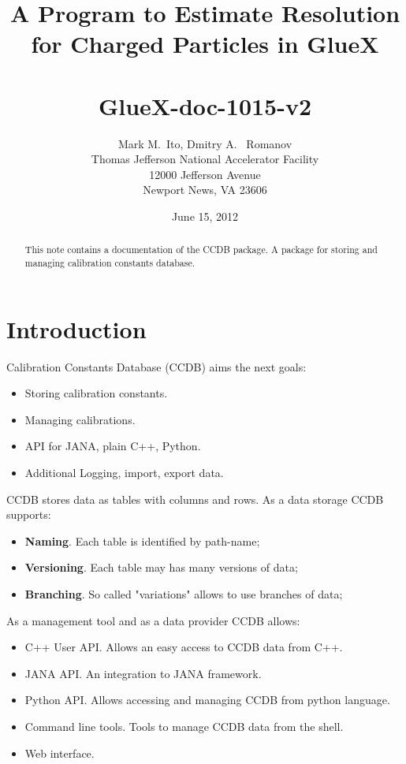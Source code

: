 \documentclass{article}
\title{A Program to Estimate Resolution for Charged Particles in GlueX \\
~\\
\large GlueX-doc-1015-v2
}
\author{Mark M.\ Ito, Dmitry A. \ Romanov \\
Thomas Jefferson National Accelerator Facility \\
12000 Jefferson Avenue \\
Newport News, VA 23606
}
\date{June 15, 2012}
\begin{document}


\maketitle

\begin{abstract}
This note contains a documentation of the CCDB package. A package for storing and managing calibration constants database.
\end{abstract}

\tableofcontents

\section{Introduction}


%

Calibration Constants Database (CCDB) aims the next goals:
\begin{itemize}
\item Storing calibration constants.
\item Managing calibrations.
\item API for JANA, plain C++, Python.
\item Additional Logging, import, export data.
\end{itemize}


CCDB stores data as tables with columns and rows. As a data storage CCDB supports:
\begin{itemize}
\item \textbf{Naming}. Each table is identified by path-name;
\item \textbf{Versioning}. Each table may has many versions of data;
\item \textbf{Branching}. So called "variations" allows to use branches of data;
\end{itemize}


As a management tool and as a data provider CCDB allows:
\begin{itemize}
\item C++ User API. Allows an easy access to CCDB data from C++.
\item JANA API. An integration to JANA framework.
\item Python API. Allows accessing and managing CCDB from python language.
\item Command line tools. Tools to manage CCDB data from the shell.
\item Web interface.
\end{itemize}
\end{document}
